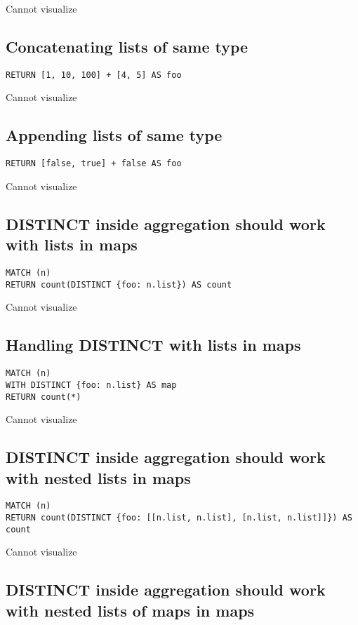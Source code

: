 Cannot visualize
\subsection{Concatenating lists of same type}

\begin{lstlisting}
RETURN [1, 10, 100] + [4, 5] AS foo
\end{lstlisting}

Cannot visualize
\subsection{Appending lists of same type}

\begin{lstlisting}
RETURN [false, true] + false AS foo
\end{lstlisting}

Cannot visualize
\subsection{DISTINCT inside aggregation should work with lists in maps}

\begin{lstlisting}
MATCH (n)
RETURN count(DISTINCT {foo: n.list}) AS count
\end{lstlisting}

Cannot visualize
\subsection{Handling DISTINCT with lists in maps}

\begin{lstlisting}
MATCH (n)
WITH DISTINCT {foo: n.list} AS map
RETURN count(*)
\end{lstlisting}

Cannot visualize
\subsection{DISTINCT inside aggregation should work with nested lists in maps}

\begin{lstlisting}
MATCH (n)
RETURN count(DISTINCT {foo: [[n.list, n.list], [n.list, n.list]]}) AS count
\end{lstlisting}

Cannot visualize
\subsection{DISTINCT inside aggregation should work with nested lists of maps in maps}

